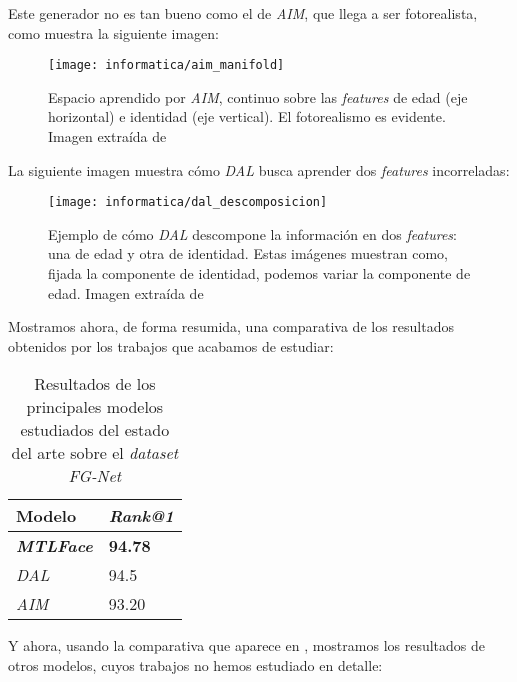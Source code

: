 Este generador no es tan bueno como el de \textit{AIM}, que llega a ser fotorealista, como muestra la siguiente imagen:

\begin{figure}[H]
    \centering
    \texttt{[image: informatica/aim\_manifold]}
    \caption{Espacio aprendido por \textit{AIM}, continuo sobre las \textit{features} de edad (eje horizontal) e identidad (eje vertical). El fotorealismo es evidente. Imagen extraída de \cite{informatica:aim}}
\end{figure}

La siguiente imagen muestra cómo \textit{DAL} busca aprender dos \textit{features} incorreladas:

\begin{figure}[H]
    \centering
    \texttt{[image: informatica/dal\_descomposicion]}
    \caption{Ejemplo de cómo \textit{DAL} descompone la información en dos \textit{features}: una de edad y otra de identidad. Estas imágenes muestran como, fijada la componente de identidad, podemos variar la componente de edad. Imagen extraída de \cite{informatica:dal}}
\end{figure}

Mostramos ahora, de forma resumida, una comparativa de los resultados obtenidos por los trabajos que acabamos de estudiar:

\begin{table}[H]
\centering
\begin{tabular}{|l|l|}
    \hline
    Modelo & \textit{Rank@1} \\
    \hline

    \textbf{\textit{MTLFace}} & \textbf{94.78} \\
    \textit{DAL} & 94.5 \\
    \textit{AIM} & 93.20 \\
    \hline

\end{tabular}
\caption{Resultados de los principales modelos estudiados del estado del arte sobre el \textit{dataset} \textit{FG-Net}}
\end{table}

Y ahora, usando la comparativa que aparece en \cite{informatica:best_fgnet_model}, mostramos los resultados de otros modelos, cuyos trabajos no hemos estudiado en detalle:

